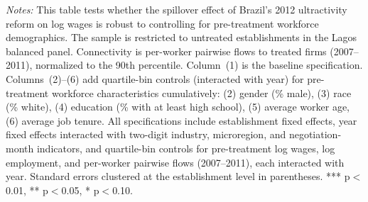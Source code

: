 \begin{table}[H]
\begin{threeparttable}
\begin{tablenotes}
\item \textit{Notes:} This table tests whether the spillover effect of Brazil's 2012 ultractivity reform on log wages is robust to controlling for pre-treatment workforce demographics. The sample is restricted to untreated establishments in the Lagos balanced panel. Connectivity is per-worker pairwise flows to treated firms (2007--2011), normalized to the 90th percentile. Column~(1) is the baseline specification. Columns~(2)--(6) add quartile-bin controls (interacted with year) for pre-treatment workforce characteristics cumulatively: (2) gender (\% male), (3) race (\% white), (4) education (\% with at least high school), (5) average worker age, (6) average job tenure. All specifications include establishment fixed effects, year fixed effects interacted with two-digit industry, microregion, and negotiation-month indicators, and quartile-bin controls for pre-treatment log wages, log employment, and per-worker pairwise flows (2007--2011), each interacted with year. Standard errors clustered at the establishment level in parentheses. *** p$<$0.01, ** p$<$0.05, * p$<$0.10.
\end{tablenotes}
\end{threeparttable}
\end{table}